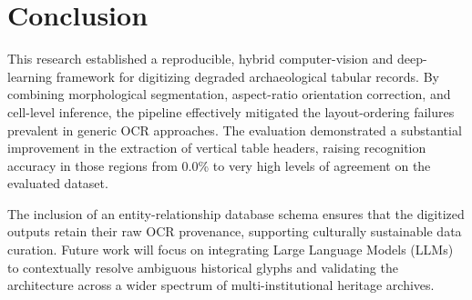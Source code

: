 \documentclass[pdflatex,sn-mathphys-num]{sn-jnl}
\begin{document}

\section{Conclusion}
\label{sec:conclusion}

This research established a reproducible, hybrid computer-vision and deep-learning framework for digitizing degraded archaeological tabular records. By combining morphological segmentation, aspect-ratio orientation correction, and cell-level inference, the pipeline effectively mitigated the layout-ordering failures prevalent in generic OCR approaches. The evaluation demonstrated a substantial improvement in the extraction of vertical table headers, raising recognition accuracy in those regions from 0.0\% to very high levels of agreement on the evaluated dataset.

The inclusion of an entity-relationship database schema ensures that the digitized outputs retain their raw OCR provenance, supporting culturally sustainable data curation. Future work will focus on integrating Large Language Models (LLMs) to contextually resolve ambiguous historical glyphs and validating the architecture across a wider spectrum of multi-institutional heritage archives.

\backmatter
\end{document}
